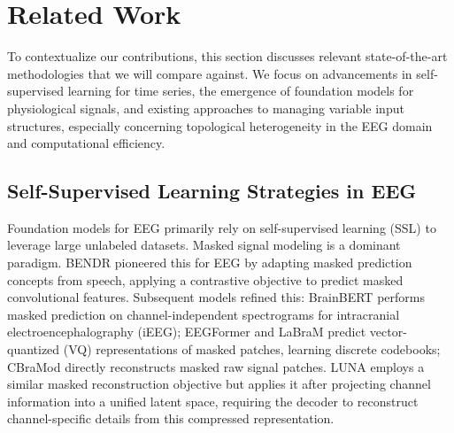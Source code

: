\section{Related Work}
\label{sec:related_work}

To contextualize our contributions, this section discusses relevant state-of-the-art methodologies that we will compare against. We focus on advancements in self-supervised learning for time series, the emergence of foundation models for physiological signals, and existing approaches to managing variable input structures, especially concerning topological heterogeneity in the EEG domain and computational efficiency.

\subsection{Self-Supervised Learning Strategies in EEG}
Foundation models for EEG primarily rely on self-supervised learning (SSL) to leverage large unlabeled datasets. Masked signal modeling is a dominant paradigm. BENDR \citep{kostas2021bendr} pioneered this for EEG by adapting masked prediction concepts from speech, applying a contrastive objective to predict masked convolutional features. Subsequent models refined this: BrainBERT \citep{wang2023brainbert} performs masked prediction on channel-independent spectrograms for intracranial electroencephalography (iEEG); EEGFormer \citep{chen2024eegformer} and LaBraM \citep{jiang2024large} predict vector-quantized (VQ) representations of masked patches, learning discrete codebooks; CBraMod \citep{wang2024cbramod} directly reconstructs masked raw signal patches. LUNA employs a similar masked reconstruction objective but applies it after projecting channel information into a unified latent space, requiring the decoder to reconstruct channel-specific details from this compressed representation. 

